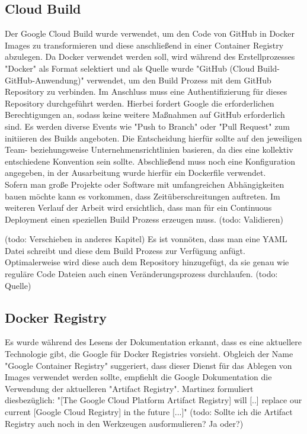 \documentclass[pdftex,a4paper,abstracton,11pt,parskip=half,bibtotocnumbered]{scrartcl}
\begin{document}
	\subsection{Cloud Build}
	Der Google Cloud Build wurde verwendet, um den Code von GitHub in Docker Images zu transformieren und diese anschließend in einer Container Registry 
	abzulegen. Da Docker verwendet werden soll, wird während des Erstellprozesses "Docker" als Format selektiert und als Quelle wurde "GitHub 
	(Cloud Build-GitHub-Anwendung)" verwendet, um den Build Prozess mit dem GitHub Repository zu verbinden. Im Anschluss muss eine Authentifizierung für dieses
	Repository durchgeführt werden. Hierbei fordert Google die erforderlichen Berechtigungen an, sodass keine weitere Maßnahmen auf GitHub erforderlich sind. 
	Es werden diverse Events wie "Push to Branch" oder "Pull Request" zum initiieren des Builds angeboten. Die Entscheidung hierfür sollte auf den
	jeweiligen Team- beziehungsweise Unternehmensrichtlinien basieren, da dies eine kollektiv entschiedene Konvention sein sollte.
	Abschließend muss noch eine Konfiguration angegeben, in der Ausarbeitung wurde hierfür ein Dockerfile verwendet.\\
	Sofern man große Projekte oder Software mit umfangreichen Abhängigkeiten bauen möchte kann es vorkommen, dass Zeitüberschreitungen auftreten.  
	Im weiteren Verlauf der Arbeit wird ersichtlich, dass man für ein Continuous Deployment einen speziellen Build Prozess erzeugen muss. (todo: Validieren)

	
	(todo: Verschieben in anderes Kapitel) Es ist vonnöten, dass man eine YAML Datei schreibt und diese dem Build Prozess zur Verfügung anfügt. Optimalerweise wird diese auch dem Repository 
	hinzugefügt, da sie genau wie reguläre Code Dateien auch einen Veränderungsprozess durchlaufen. (todo: Quelle)

	\subsection{Docker Registry}
	Es wurde während des Lesens der Dokumentation erkannt, dass es eine aktuellere Technologie gibt, die Google für Docker Registries vorsieht.
	Obgleich der Name "Google Container Registry" suggeriert, dass dieser Dienst für das Ablegen von Images verwendet werden sollte, empfiehlt die Google
	Dokumentation die Verwendung der aktuelleren "Artifact Registry". Martinez formuliert diesbezüglich: "[The Google Cloud Platform Artifact 
	Registry] will [..] replace our current	[Google Cloud Registry] in the future [...]" \cite{artifactRegistryReplacesGCP} 
	(todo: Sollte ich die Artifact Registry auch noch in den Werkzeugen ausformulieren? Ja oder?)
\end{document}
